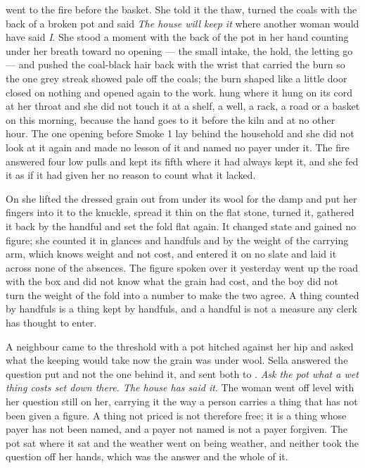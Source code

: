  went to the fire before the basket. She told it the thaw, turned the coals with the back of a broken pot and said \emph{The house will keep it} where another woman would have said \emph{I}. She stood a moment with the back of the pot in her hand counting under her breath toward no opening --- the small intake, the hold, the letting go --- and pushed the coal-black hair back with the wrist that carried the burn so the one grey streak showed pale off the coals; the burn shaped like a little door closed on nothing and opened again to the work.  hung where it hung on its cord at her throat and she did not touch it at a shelf, a well, a rack, a road or a basket on this morning, because the hand goes to it before the kiln and at no other hour. The one opening before Smoke 1 lay behind the household and she did not look at it again and made no lesson of it and named no payer under it. The fire answered four low pulls and kept its fifth where it had always kept it, and she fed it as if it had given her no reason to count what it lacked.

On  she lifted the dressed grain out from under its wool for the damp and put her fingers into it to the knuckle, spread it thin on the flat stone, turned it, gathered it back by the handful and set the fold flat again. It changed state and gained no figure; she counted it in glances and handfuls and by the weight of the carrying arm, which knows weight and not cost, and entered it on no slate and laid it across none of the absences. The figure spoken over it yesterday went up the road with the box and did not know what the grain had cost, and the boy did not turn the weight of the fold into a number to make the two agree. A thing counted by handfuls is a thing kept by handfuls, and a handful is not a measure any clerk has thought to enter.

\scenebreak

A neighbour came to the threshold with a pot hitched against her hip and asked what the keeping would take now the grain was under wool. Sella answered the question put and not the one behind it, and sent both to . \emph{Ask the pot what a wet thing costs set down there. The house has said it}. The woman went off level with her question still on her, carrying it the way a person carries a thing that has not been given a figure. A thing not priced is not therefore free; it is a thing whose payer has not been named, and a payer not named is not a payer forgiven. The pot sat where it sat and the weather went on being weather, and neither took the question off her hands, which was the answer and the whole of it.

